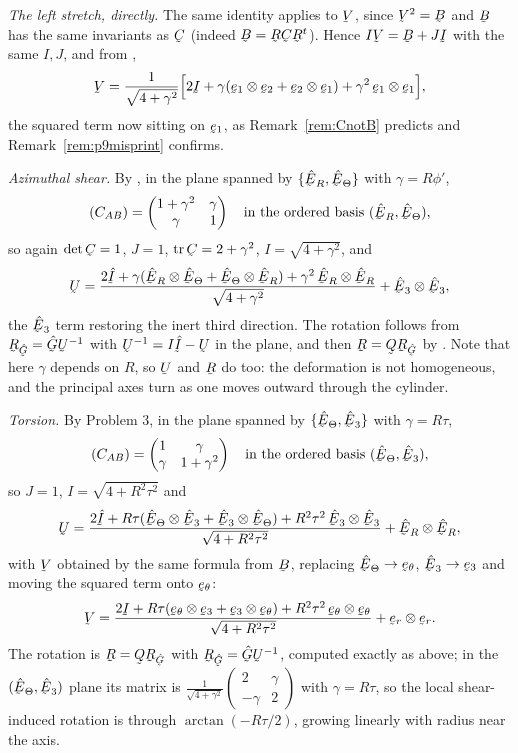 \begin{solution}
\emph{The left stretch, directly.} The same identity applies to $\bV$,
since $\bV^{2}=\bB$ and $\bB$ has the same invariants as $\bC$ (indeed
$\bB=\bR\bC\bR^{t}$). Hence $I\bV=\bB+J\I$ with the same $I,J$, and from
,
\[
   \bV=\frac{1}{\sqrt{4+\gamma^{2}}}
   \Big[2\I+\gamma(\be_{1}\otimes\be_{2}+\be_{2}\otimes\be_{1})
   +\gamma^{2}\,\be_{1}\otimes\be_{1}\Big],
\]
the squared term now sitting on $\be_{1}$, as
Remark~\ref{rem:CnotB} predicts and Remark~\ref{rem:p9misprint} confirms.

\smallskip
\emph{Azimuthal shear.} By , in the plane spanned by
$\{\hER,\hETh\}$ with $\gamma=R\phi'$,
\[
   (C_{AB})=\begin{pmatrix}1+\gamma^{2}&\gamma\\ \gamma&1\end{pmatrix}
   \quad\text{in the ordered basis }(\hER,\hETh),
\]
so again $\det\bC=1$, $J=1$, $\tr\bC=2+\gamma^{2}$,
$I=\sqrt{4+\gamma^{2}}$, and
\[
   \bU=\frac{2\hI+\gamma(\hER\otimes\hETh+\hETh\otimes\hER)
        +\gamma^{2}\,\hER\otimes\hER}{\sqrt{4+\gamma^{2}}}
      +\hbE_{3}\otimes\hbE_{3},
\]
the $\hbE_{3}$ term restoring the inert third direction. The rotation
follows from $\bR_{\hat\bG}=\hat\bG\bU^{-1}$ with
$\bU^{-1}=I\hI-\bU$ in the plane, and then $\bR=\bQ\bR_{\hat\bG}$ by
. Note that here $\gamma$ depends on $R$, so $\bU$ and $\bR$ do
too: the deformation is not homogeneous, and the principal axes turn as
one moves outward through the cylinder.

\smallskip
\emph{Torsion.} By Problem 3, in the plane spanned by
$\{\hETh,\hbE_{3}\}$ with $\gamma=R\tau$,
\[
   (C_{AB})=\begin{pmatrix}1&\gamma\\ \gamma&1+\gamma^{2}\end{pmatrix}
   \quad\text{in the ordered basis }(\hETh,\hbE_{3}),
\]
so $J=1$, $I=\sqrt{4+R^{2}\tau^{2}}$ and
\[
   \bU=\frac{2\hI+R\tau(\hETh\otimes\hbE_{3}+\hbE_{3}\otimes\hETh)
        +R^{2}\tau^{2}\,\hbE_{3}\otimes\hbE_{3}}
       {\sqrt{4+R^{2}\tau^{2}}}+\hER\otimes\hER ,
\]
with $\bV$ obtained by the same formula from $\bB$, replacing
$\hETh\to\bet$, $\hbE_{3}\to\be_{3}$ and moving the squared term onto
$\bet$:
\[
   \bV=\frac{2\I+R\tau(\bet\otimes\be_{3}+\be_{3}\otimes\bet)
        +R^{2}\tau^{2}\,\bet\otimes\bet}
       {\sqrt{4+R^{2}\tau^{2}}}+\ber\otimes\ber .
\]
The rotation is $\bR=\bQ\bR_{\hat\bG}$ with
$\bR_{\hat\bG}=\hat\bG\bU^{-1}$, computed exactly as above; in the
$(\hETh,\hbE_{3})$ plane its matrix is
$\tfrac{1}{\sqrt{4+\gamma^{2}}}\begin{pmatrix}2&\gamma\\ -\gamma&2
\end{pmatrix}$ with $\gamma=R\tau$, so the local shear-induced rotation is
through $\arctan(-R\tau/2)$, growing linearly with radius near the axis.
\end{solution}

